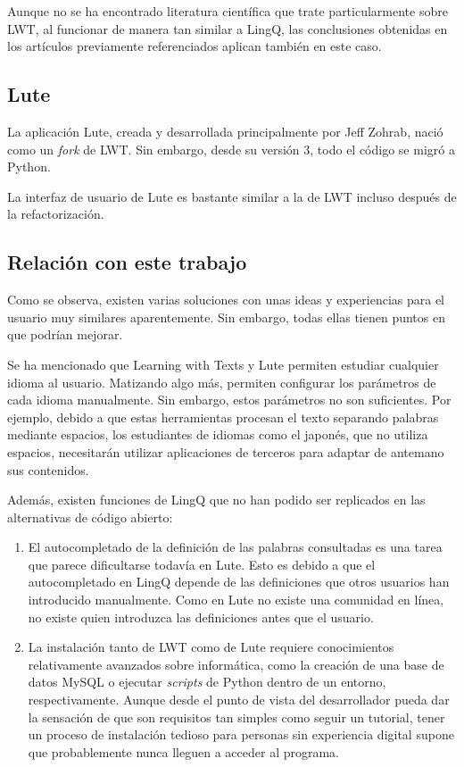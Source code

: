 Aunque no se ha encontrado literatura científica que trate particularmente sobre LWT, al funcionar de manera tan similar a LingQ, las conclusiones obtenidas en los artículos previamente referenciados aplican también en este caso.

\subsection{Lute}

La aplicación Lute, creada y desarrollada principalmente por Jeff Zohrab, nació como un \textit{fork} de LWT. Sin embargo, desde su versión 3, todo el código se migró a Python. \autocite{Lute}

La interfaz de usuario de Lute es bastante similar a la de LWT incluso después de la refactorización. 

\subsection{Relación con este trabajo}

Como se observa, existen varias soluciones con unas ideas y experiencias para el usuario muy similares aparentemente. Sin embargo, todas ellas tienen puntos en que podrían mejorar.

Se ha mencionado que Learning with Texts y Lute permiten estudiar cualquier idioma al usuario. Matizando algo más, permiten configurar los parámetros de cada idioma manualmente. Sin embargo, estos parámetros no son suficientes. Por ejemplo, debido a que estas herramientas procesan el texto separando palabras mediante espacios, los estudiantes de idiomas como el japonés, que no utiliza espacios, necesitarán utilizar aplicaciones de terceros para adaptar de antemano sus contenidos.

Además, existen funciones de LingQ que no han podido ser replicados en las alternativas de código abierto:
\begin{enumerate}
	\item El autocompletado de la definición de las palabras consultadas es una tarea que parece dificultarse todavía en Lute. Esto es debido a que el autocompletado en LingQ depende de las definiciones que otros usuarios han introducido manualmente. Como en Lute no existe una comunidad en línea, no existe quien introduzca las definiciones antes que el usuario.
	\item La instalación tanto de LWT como de Lute requiere conocimientos relativamente avanzados sobre informática, como la creación de una base de datos MySQL o ejecutar \textit{scripts} de Python dentro de un entorno, respectivamente. Aunque desde el punto de vista del desarrollador pueda dar la sensación de que son requisitos tan simples como seguir un tutorial, tener un proceso de instalación tedioso para personas sin experiencia digital supone que probablemente nunca lleguen a acceder al programa. \citationNeeded
\end{enumerate}


